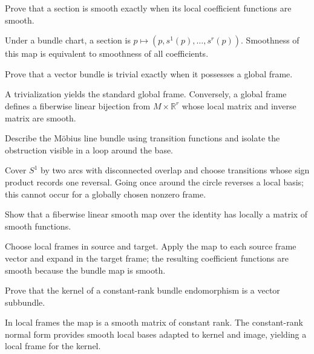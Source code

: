 \begin{problem}\label{prob:vii07-05}
Prove that a section is smooth exactly when its local coefficient functions are smooth.
\end{problem}
\begin{solution}
Under a bundle chart, a section is \(p\mapsto(p,s^1(p),\ldots,s^r(p))\). Smoothness of this map is equivalent to smoothness of all coefficients.
\end{solution}

\begin{problem}\label{prob:vii07-06}
Prove that a vector bundle is trivial exactly when it possesses a global frame.
\end{problem}
\begin{solution}
A trivialization yields the standard global frame. Conversely, a global frame defines a fiberwise linear bijection from \(M\times\mathbb R^r\) whose local matrix and inverse matrix are smooth.
\end{solution}

\begin{problem}\label{prob:vii07-07}
Describe the Möbius line bundle using transition functions and isolate the obstruction visible in a loop around the base.
\end{problem}
\begin{solution}
Cover \(S^1\) by two arcs with disconnected overlap and choose transitions whose sign product records one reversal. Going once around the circle reverses a local basis; this cannot occur for a globally chosen nonzero frame.
\end{solution}

\begin{problem}\label{prob:vii07-08}
Show that a fiberwise linear smooth map over the identity has locally a matrix of smooth functions.
\end{problem}
\begin{solution}
Choose local frames in source and target. Apply the map to each source frame vector and expand in the target frame; the resulting coefficient functions are smooth because the bundle map is smooth.
\end{solution}

\begin{problem}\label{prob:vii07-09}
Prove that the kernel of a constant-rank bundle endomorphism is a vector subbundle.
\end{problem}
\begin{solution}
In local frames the map is a smooth matrix of constant rank. The constant-rank normal form provides smooth local bases adapted to kernel and image, yielding a local frame for the kernel.
\end{solution}

